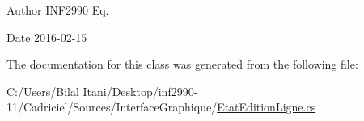 \begin{DoxyAuthor}{Author}
I\+N\+F2990 Eq. 
\end{DoxyAuthor}
\begin{DoxyDate}{Date}
2016-\/02-\/15 
\end{DoxyDate}


The documentation for this class was generated from the following file\+:\begin{DoxyCompactItemize}
\item 
C\+:/\+Users/\+Bilal Itani/\+Desktop/inf2990-\/11/\+Cadriciel/\+Sources/\+Interface\+Graphique/\hyperlink{_etat_edition_ligne_8cs}{Etat\+Edition\+Ligne.\+cs}\end{DoxyCompactItemize}
